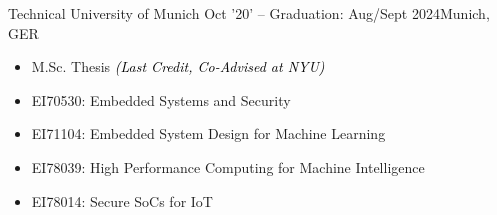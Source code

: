 \documentclass[10pt,a4paper,ragged2e,withhyper]{altacv}
\begin{document}
\begin{paracol}{2}
%

\divider

        {Technical University of Munich}
        {Oct '20' -- Graduation: Aug/Sept 2024}{Munich, GER}
\begin{itemize}
\item M.Sc. Thesis {\textcolor{black}{\textit{(Last Credit, Co-Advised at NYU)}}}
\item EI70530: Embedded Systems and Security
\item EI71104: Embedded System Design for Machine Learning
\item EI78039: High Performance Computing for Machine Intelligence
\item EI78014: Secure SoCs for IoT
\end{itemize}
\divider


\end{paracol}
\end{document}
